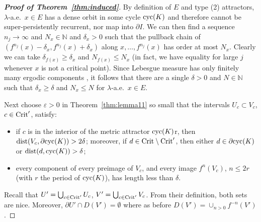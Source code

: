 \documentclass[12pt, psamsfonts, reqno]{amsart}
\begin{document}
\begin{proof}[\textbf{Proof of Theorem~\ref{thm:induced}}]
By definition of $E$ and type (2) attractors,
$\lambda$-a.e.\ $x \in E$ has a dense orbit
in some cycle ${\mathop{\rm cyc}\nolimits}(K)$ and therefore cannot be super-persistently
recurrent, nor map into $\partial I$.
We can then find a sequence $n_j\to \infty$ and $N_x \in {{\mathbb N}}$ and
$\delta_x > 0$ such that the pullback chain of
$(f^{n_j}(x)-\delta_x, f^{n_j}(x)+\delta_x)$ along $x,\ldots,
f^{n_j}(x)$ has order at most $N_x$. Clearly we can take
$\delta_{f(x)} \geq \delta_x$ and $N_{f(x)} \leq N_x$ (in fact, we
have equality for large $j$ whenever $x$ is not a critical point).
Since Lebesgue measure has only finitely many ergodic components
\cite[Theorem~2]{Lypre}, it follows that there are a single
$\delta > 0$ and $N \in {{\mathbb N}}$ such that $\delta_x \geq \delta$ and
$N_x \leq N$ for $\lambda$-a.e.\ $x \in E$.

Next choose ${\varepsilon} > 0$ in  Theorem~\ref{thm:lemma11} so small that the intervals
$U_c\subset V_c$, $c\in {\mathop{\rm Crit}\nolimits}'$, satisfy:
\begin{itemize}
 \item if $c$ is in the interior of the metric attractor
 ${\mathop{\rm cyc}\nolimits}(K)$r, then ${\mathop{\rm dist}\nolimits}(V_c,\partial{\mathop{\rm cyc}\nolimits}(K))>2\delta$;
 moreover, if $d\in {\mathop{\rm Crit}\nolimits}\setminus {\mathop{\rm Crit}\nolimits}'$, then either $d\in
 \partial {\mathop{\rm cyc}\nolimits}(K)$ or ${\mathop{\rm dist}\nolimits}(d,{\mathop{\rm cyc}\nolimits}(K))>\delta$;
 \item every component of every preimage of $V_c$, and every
 image $f^n(V_c)$, $n\leq 2r$ (with $r$ the period of ${\mathop{\rm cyc}\nolimits}(K)$),
 has length less than $\delta$.
\end{itemize}
Recall that $U'=\bigcup_{c\in {\mathop{\rm Crit}\nolimits}'}U_c$, $V'=\bigcup_{c\in
{\mathop{\rm Crit}\nolimits}'}V_c$. From their definition, both sets are nice. Moreover,
$\partial U'\cap D(V')=\emptyset$ where as before $D(V') = \cup_{n
> 0} f^{-n}(V')$.


\end{proof}
\end{document}
